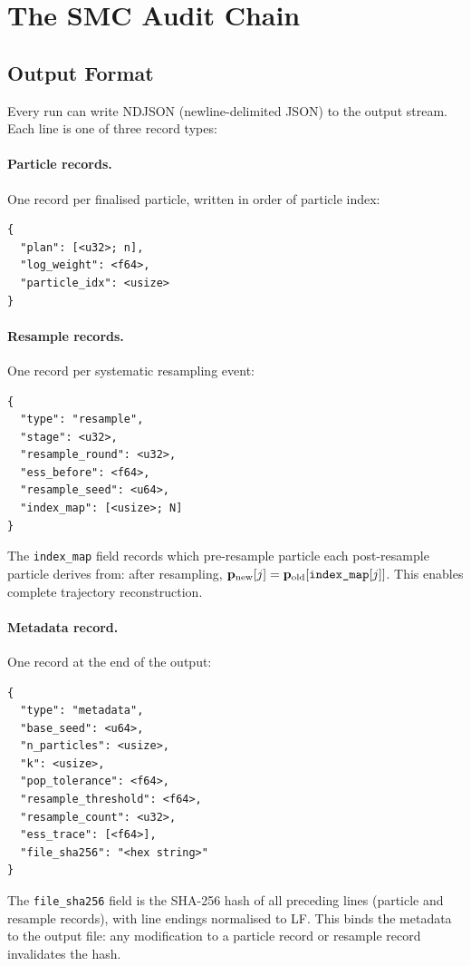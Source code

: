 \section{The SMC Audit Chain}
\label{sec:audit}

\subsection{Output Format}

Every \smc{} run can write NDJSON (newline-delimited JSON) to the output
stream.
Each line is one of three record types:

\paragraph{Particle records.}
One record per finalised particle, written in order of particle index:
\begin{verbatim}
{
  "plan": [<u32>; n],
  "log_weight": <f64>,
  "particle_idx": <usize>
}
\end{verbatim}

\paragraph{Resample records.}
One record per systematic resampling event:
\begin{verbatim}
{
  "type": "resample",
  "stage": <u32>,
  "resample_round": <u32>,
  "ess_before": <f64>,
  "resample_seed": <u64>,
  "index_map": [<usize>; N]
}
\end{verbatim}
The \texttt{index\_map} field records which pre-resample particle each
post-resample particle derives from: after resampling,
$\mathbf{p}_{\rm new}[j] = \mathbf{p}_{\rm old}[\texttt{index\_map}[j]]$.
This enables complete trajectory reconstruction.

\paragraph{Metadata record.}
One record at the end of the output:
\begin{verbatim}
{
  "type": "metadata",
  "base_seed": <u64>,
  "n_particles": <usize>,
  "k": <usize>,
  "pop_tolerance": <f64>,
  "resample_threshold": <f64>,
  "resample_count": <u32>,
  "ess_trace": [<f64>],
  "file_sha256": "<hex string>"
}
\end{verbatim}
The \texttt{file\_sha256} field is the SHA-256 hash of all preceding lines
(particle and resample records), with line endings normalised to LF.
This binds the metadata to the output file: any modification to a particle
record or resample record invalidates the hash.

